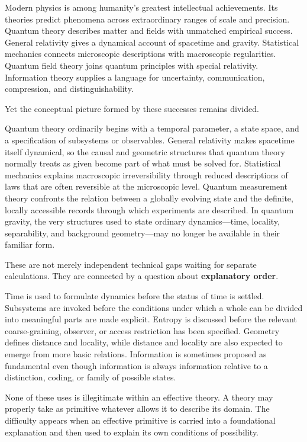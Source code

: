 \documentclass[
  11pt,
]{article}
\begin{document}
Modern physics is among humanity's greatest intellectual achievements.
Its theories predict phenomena across extraordinary ranges of scale and
precision. Quantum theory describes matter and fields with unmatched
empirical success. General relativity gives a dynamical account of
spacetime and gravity. Statistical mechanics connects microscopic
descriptions with macroscopic regularities. Quantum field theory joins
quantum principles with special relativity. Information theory supplies
a language for uncertainty, communication, compression, and
distinguishability.

Yet the conceptual picture formed by these successes remains divided.

Quantum theory ordinarily begins with a temporal parameter, a state
space, and a specification of subsystems or observables. General
relativity makes spacetime itself dynamical, so the causal and geometric
structures that quantum theory normally treats as given become part of
what must be solved for. Statistical mechanics explains macroscopic
irreversibility through reduced descriptions of laws that are often
reversible at the microscopic level. Quantum measurement theory
confronts the relation between a globally evolving state and the
definite, locally accessible records through which experiments are
described. In quantum gravity, the very structures used to state
ordinary dynamics---time, locality, separability, and background
geometry---may no longer be available in their familiar form.

These are not merely independent technical gaps waiting for separate
calculations. They are connected by a question about \textbf{explanatory
order}.

Time is used to formulate dynamics before the status of time is settled.
Subsystems are invoked before the conditions under which a whole can be
divided into meaningful parts are made explicit. Entropy is discussed
before the relevant coarse-graining, observer, or access restriction has
been specified. Geometry defines distance and locality, while distance
and locality are also expected to emerge from more basic relations.
Information is sometimes proposed as fundamental even though information
is always information relative to a distinction, coding, or family of
possible states.

None of these uses is illegitimate within an effective theory. A theory
may properly take as primitive whatever allows it to describe its
domain. The difficulty appears when an effective primitive is carried
into a foundational explanation and then used to explain its own
conditions of possibility.
\end{document}
